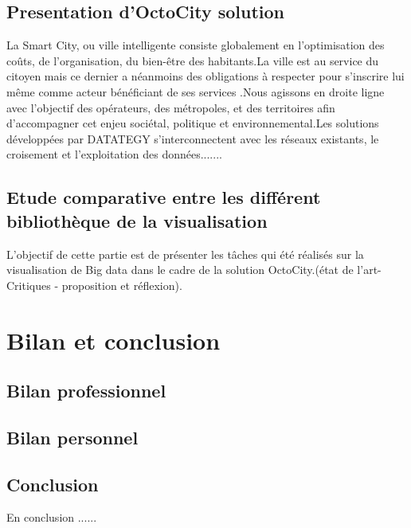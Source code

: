\documentclass[french, a4paper, 12pt]{report}
\begin{document}
\section{Presentation d’OctoCity solution}
La Smart City, ou ville intelligente consiste globalement en l’optimisation des coûts, de l’organisation, du bien-être des habitants.La ville est au service du citoyen mais ce dernier a néanmoins des obligations à respecter pour s’inscrire lui même comme acteur bénéficiant de ses services .Nous agissons en droite ligne avec l’objectif des opérateurs, des métropoles, et des territoires afin d’accompagner cet enjeu sociétal, politique et environnemental.Les solutions développées par DATATEGY s’interconnectent avec les réseaux existants, le croisement et l’exploitation des données.......
\section{Etude comparative entre les différent bibliothèque de la visualisation}
L'objectif de cette partie est de présenter les tâches qui été réalisés sur la visualisation de Big data dans le cadre de la solution OctoCity.(état de l’art- Critiques - proposition et réflexion).




\chapter{ Bilan et conclusion}
\section{Bilan professionnel}
\section{Bilan personnel}
\section{Conclusion}
En conclusion ...... 
\end{document}
